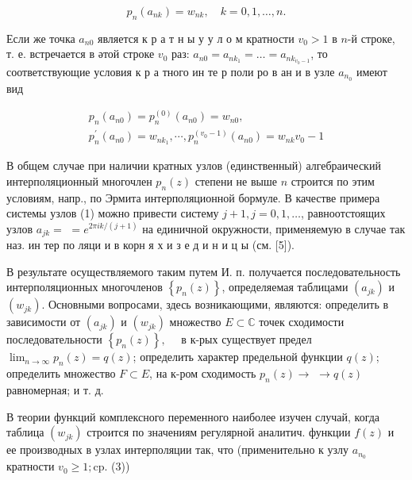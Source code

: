 \documentclass[10pt]{article}
\begin{document}
\[

p_{n}\left(a_{n k}\right)=w_{n k}, \quad k=0,1, \ldots, n .

\]



Если же точка $a_{n 0}$ является к р а т н ы у у л о м кратности $v_{0}>1$ в $n$-й строке, т. е. встречается в әтой строке $v_{0}$ раз: $a_{n 0}=a_{n k_{1}}=\ldots=a_{n k_{v_{0}-1}}$, то соответствующие условия к р а тного ин те р поли ро в ан и в узле $a_{n_{0}}$ имеют вид



\[

\begin{gathered}

p_{n}\left(a_{n 0}\right)=p_{n}^{(0)}\left(a_{n 0}\right)=w_{n 0}, \\

p_{n}^{\prime}\left(a_{n 0}\right)=w_{n k_{1}}, \cdots, p_{n}^{\left(v_{0}-1\right)}\left(a_{n 0}\right)=w_{n k} v_{0}-1

\end{gathered}

\]



В общем случае при наличии кратных узлов (единственный) алгебраический интерполяционный многочлен $p_{n}(z)$ степени не выше $n$ строится по этим условиям, напр., по Эрмита интерполяционной бормуле. В качестве примера системы узлов (1) можно привести систему $j+1, j=0,1, \ldots$, равноотстоящих узлов $a_{j k}=$ $=e^{2 \pi i k /(j+1)}$ на единичной окружности, применяемую в случае так наз. ин тер по ляци и в корн я х и $з$ е д и н и ц ы (см. [5]).



В результате осуществляемого таким путем И. п. получается последовательность интерполяционных многочленов $\left\{p_{n}(z)\right\}$, определяемая таблицами $\left(a_{j k}\right)$ и $\left(w_{j k}\right)$. Основными вопросами, здесь возникающими, являются: определить в зависимости от $\left(a_{j k}\right)$ и $\left(w_{j k}\right)$ множество $E \subset \mathbb{C}$ точек сходимости последовательности $\left\{p_{n}(z)\right\}, \quad$ в к-рых существует предел $\lim _{n \rightarrow \infty} p_{n}(z)=q(z)$; определить характер предельной функции $q(z)$; определить множество $F \subset E$, на к-ром сходимость $p_{n}(z) \rightarrow$ $\rightarrow q(z)$ равномерная; и т. д.



В теории функций комплексного переменного наиболее изучен случай, когда таблица $\left(w_{j k}\right)$ строится по значениям регулярной аналитич. функции $f(z)$ и ее производных в узлах интерполяции так, что (применительно к узлу $a_{n_{0}}$ кратности $v_{0} \geqslant 1 ; \mathrm{cp}$. (3))
\end{document}
